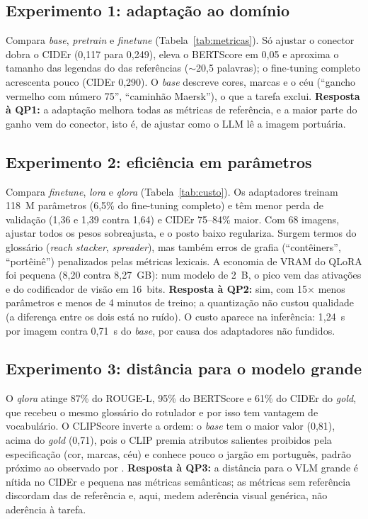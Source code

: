 \documentclass[12pt]{article}
\begin{document}
\subsection{Experimento 1: adaptação ao domínio}

Compara \textit{base}, \textit{pretrain} e \textit{finetune}
(Tabela~\ref{tab:metricas}). Só ajustar o conector dobra o CIDEr (0,117 para
0,249), eleva o BERTScore em 0,05 e aproxima o tamanho das legendas do das
referências ($\sim$20,5 palavras); o fine-tuning completo acrescenta pouco
(CIDEr 0,290). O \textit{base} descreve cores, marcas e o céu (``gancho
vermelho com número 75'', ``caminhão Maersk''), o que a tarefa exclui.
\textbf{Resposta à QP1:} a adaptação melhora todas as métricas de
referência, e a maior parte do ganho vem do conector, isto é, de ajustar
como o LLM lê a imagem portuária.

\subsection{Experimento 2: eficiência em parâmetros}

Compara \textit{finetune}, \textit{lora} e \textit{qlora}
(Tabela~\ref{tab:custo}). Os adaptadores treinam 118~M parâmetros (6,5\% do
fine-tuning completo) e têm menor perda de validação (1,36 e 1,39 contra
1,64) e CIDEr 75--84\% maior. Com 68 imagens, ajustar todos os pesos
sobreajusta, e o posto baixo regulariza. Surgem termos do glossário
(\textit{reach stacker}, \textit{spreader}), mas também erros de grafia
(``contêiners'', ``portêinê'') penalizados pelas métricas lexicais. A
economia de VRAM do QLoRA foi pequena (8,20 contra 8,27~GB): num modelo de
2~B, o pico vem das ativações e do codificador de visão em 16~bits.
\textbf{Resposta à QP2:} sim, com 15$\times$ menos parâmetros e menos de
4 minutos de treino; a quantização não custou qualidade (a diferença entre
os dois está no ruído). O custo aparece na inferência: 1,24~s por imagem
contra 0,71~s do \textit{base}, por causa dos adaptadores não fundidos.

\subsection{Experimento 3: distância para o modelo grande}

O \textit{qlora} atinge 87\% do ROUGE-L, 95\% do BERTScore e 61\% do CIDEr
do \textit{gold}, que recebeu o mesmo glossário do rotulador e por isso tem
vantagem de vocabulário. O CLIPScore inverte a ordem: o \textit{base} tem o
maior valor (0,81), acima do \textit{gold} (0,71), pois o CLIP premia
atributos salientes proibidos pela especificação (cor, marcas, céu) e
conhece pouco o jargão em português, padrão próximo ao observado por
. \textbf{Resposta à QP3:} a distância
para o VLM grande é nítida no CIDEr e pequena nas métricas semânticas; as
métricas sem referência discordam das de referência e, aqui, medem
aderência visual genérica, não aderência à tarefa.
\end{document}
